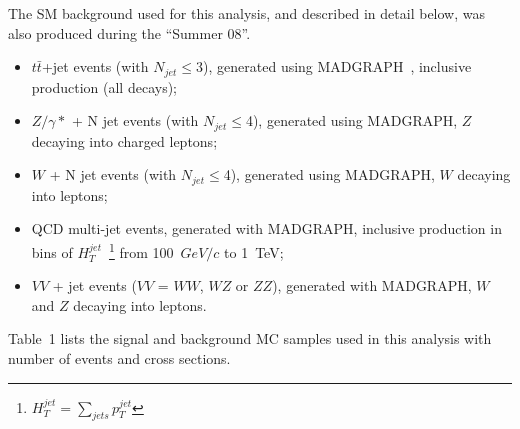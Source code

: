 \documentclass{cmspaper}
\begin{document}
\begin{linenumbers}
The SM background used for this analysis, and described in detail below,
was also produced during the ``Summer 08''.
\begin{itemize}
%
\item $t\bar{t}$+jet events (with $N_{jet}\le$3), generated using MADGRAPH~\cite{MADGRAPH}, inclusive production (all decays); 
%
\item $Z/\gamma*$ + N jet events (with $N_{jet}\le$4), generated using MADGRAPH, $Z$ decaying into charged leptons;  
%
\item $W$ + N jet events (with $N_{jet}\le$4), generated using MADGRAPH, $W$ decaying into leptons; 
%
\item QCD multi-jet events, generated with MADGRAPH, inclusive production in 
bins of $H_{T}^{jet}$~\footnote{$H_{T}^{jet}=\sum_{jets} p_T^{jet}$} from 100~$GeV/c$ to 1~TeV;  
%
%
\item $VV$ + jet events ($VV$ = $WW$, $WZ$ or $ZZ$), generated with MADGRAPH, 
$W$ and $Z$ decaying into leptons.
\end{itemize} 

Table~1
lists the signal and background MC samples used in this analysis with 
number of events and cross sections.


\end{linenumbers}
\end{document}
